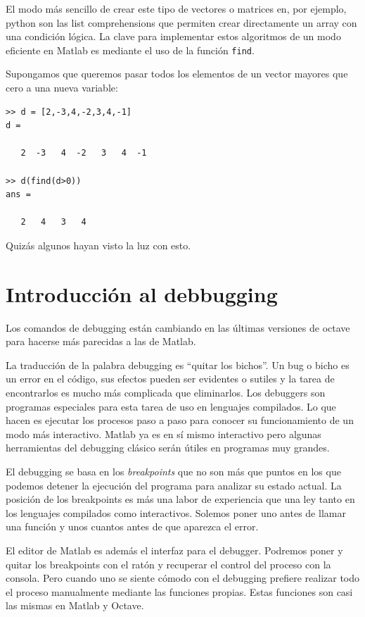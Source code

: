 El modo más sencillo de crear este tipo de vectores o matrices en, por
ejemplo, python son las list comprehensions que permiten crear
directamente un array con una condición lógica.  La clave para
implementar estos algoritmos de un modo eficiente en Matlab es
mediante el uso de la función \texttt{find}.

Supongamos que queremos pasar todos los elementos de un vector mayores
que cero a una nueva variable:

\begin{verbatim}
>> d = [2,-3,4,-2,3,4,-1]
d =

   2  -3   4  -2   3   4  -1

>> d(find(d>0))
ans =

   2   4   3   4
\end{verbatim}

Quizás algunos hayan visto la luz con esto.

\section{Introducción al debbugging}
Los comandos de debugging están cambiando en las últimas versiones de
octave para hacerse más parecidas a las de Matlab.

La traducción de la palabra debugging es ``quitar los bichos''.  Un
bug o bicho es un error en el código, sus efectos pueden ser evidentes
o sutiles y la tarea de encontrarlos es mucho más complicada que
eliminarlos.  Los debuggers son programas especiales para esta tarea
de uso en lenguajes compilados. Lo que hacen es ejecutar los procesos
paso a paso para conocer su funcionamiento de un modo más interactivo.
Matlab ya es en sí mismo interactivo pero algunas herramientas del
debugging clásico serán útiles en programas muy grandes.

El debugging se basa en los \emph{breakpoints} que no son más que
puntos en los que podemos detener la ejecución del programa para
analizar su estado actual. La posición de los breakpoints es más una
labor de experiencia que una ley tanto en los lenguajes compilados
como interactivos. Solemos poner uno antes de llamar una función y
unos cuantos antes de que aparezca el error.

El editor de Matlab es además el interfaz para el debugger. Podremos
poner y quitar los breakpoints con el ratón y recuperar el control del
proceso con la consola. Pero cuando uno se siente cómodo con el
debugging prefiere realizar todo el proceso manualmente mediante las
funciones propias. Estas funciones son casi las mismas en Matlab y
Octave.

